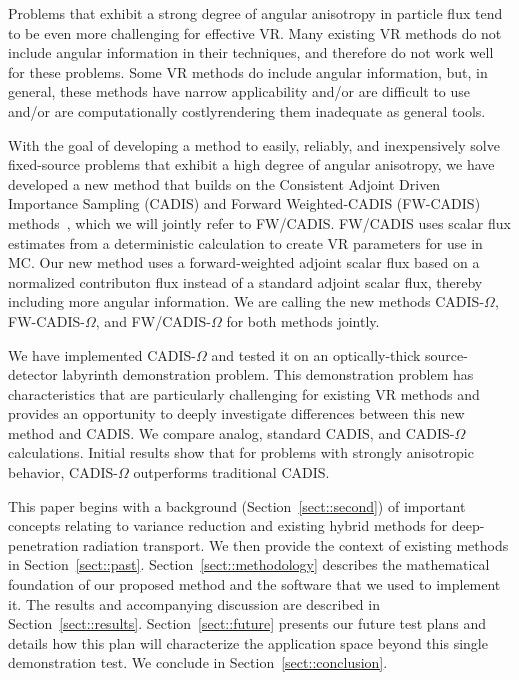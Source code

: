 \documentclass[12pt]{article}
\begin{document}
Problems that exhibit a strong degree of angular anisotropy in particle flux tend to be even more challenging for effective VR.
Many existing VR methods do not include angular information in their techniques, and therefore do not work well for these problems.  
Some VR methods do include angular information, but, in general, these methods have narrow applicability and/or are difficult to use and/or are computationally costly\textemdash rendering them inadequate as general tools.

With the goal of developing a method to easily, reliably, and inexpensively solve fixed-source problems that exhibit a high degree of angular anisotropy, we have developed a new method that builds on the Consistent Adjoint Driven Importance Sampling (CADIS) and Forward Weighted-CADIS (FW-CADIS) methods~\cite{wagner_forward-weighted_2007}, which we will jointly refer to FW/CADIS. 
FW/CADIS uses scalar flux estimates from a deterministic calculation to create VR parameters for use in MC.
Our new method uses a forward-weighted adjoint scalar flux based on a normalized contributon flux instead of a standard adjoint scalar flux, thereby including more angular information. 
We are calling the new methods CADIS-$\Omega$, FW-CADIS-$\Omega$, and FW/CADIS-$\Omega$ for both methods jointly.

We have implemented CADIS-$\Omega$ and tested it on an optically-thick source-detector labyrinth demonstration problem.
This demonstration problem has characteristics that are particularly challenging for existing VR methods and provides an opportunity to deeply investigate differences between this new method and CADIS.
We compare analog, standard CADIS, and CADIS-$\Omega$ calculations. 
Initial results show that for problems with strongly anisotropic behavior, CADIS-$\Omega$ outperforms traditional CADIS.

This paper begins with a background (Section~\ref{sect::second}) of important concepts relating to variance reduction and existing hybrid methods for deep-penetration radiation transport. 
We then provide the context of existing methods in Section~\ref{sect::past}. 
Section~\ref{sect::methodology} describes the mathematical foundation of our proposed method and the software that we used to implement it. 
The results and accompanying discussion are described in Section~\ref{sect::results}. Section~\ref{sect::future} presents our future test plans and details how this plan will characterize the application space beyond this single demonstration test. 
We conclude in Section~\ref{sect::conclusion}. 
\end{document}
